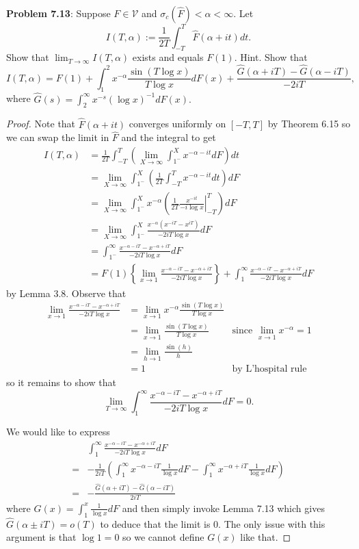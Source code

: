 \documentclass[12pt]{article}
\newcommand{\V}{\mathcal{V}}
\newcommand{\Fhat}{\widehat{F}}
\newcommand{\Ghat}{\widehat{G}}
\begin{document}
\fi

\textbf{Problem 7.13}: Suppose $F \in \V$ and $\sigma_c(\Fhat) < \alpha < \infty$. Let
$$I(T, \alpha) := \frac{1}{2T} \int_{-T}^T \Fhat(\alpha + it) dt.$$
Show that $\lim_{T \rightarrow \infty} I(T, \alpha)$ exists and equals $F(1)$. Hint. Show that
$$I(T, \alpha) = F(1) + \int_1^2 x^{-\alpha} \frac{\sin (T\log x)}{T \log x} dF(x) + \frac{\Ghat(\alpha + iT) - \Ghat(\alpha - iT)}{-2iT},$$
where $\Ghat(s) = \int_2^\infty x^{-s} (\log x)^{-1} dF(x).$

\begin{proof}
Note that $\Fhat(\alpha + it)$ converges uniformly on $[-T, T]$ by Theorem 6.15 so we can swap the limit in $\Fhat$ and the integral to get
\begin{align*}
I(T, \alpha) &= \frac{1}{2T} \int_{-T}^T \left( \lim_{X \rightarrow \infty} \int_{1^-}^X x^{-\alpha-it} dF \right) dt \\
&= \lim_{X \rightarrow \infty} \int_{1^-}^X \left( \frac{1}{2T} \int_{-T}^T x^{-\alpha-it}  dt \right) dF \\
&= \lim_{X \rightarrow \infty} \int_{1^-}^X x^{-\alpha} \left( \frac{1}{2T} \left. \frac{x^{-it}}{-i \log x} \right|_{-T}^T   \right) dF \\
&= \lim_{X \rightarrow \infty} \int_{1^-}^X \frac{x^{-\alpha}(x^{-iT} - x^{iT} )}{- 2 i T \log x} dF \\
&= \int_{1^-}^\infty \frac{x^{-\alpha-iT} - x^{-\alpha+iT}}{- 2 i T \log x} dF \\
&= F(1) \left\{ \lim_{x \rightarrow 1} \frac{x^{-\alpha-iT} - x^{-\alpha+iT}}{- 2 i T \log x} \right\} + \int_{1}^\infty \frac{x^{-\alpha-iT} - x^{-\alpha+iT}}{- 2 i T \log x} dF
\end{align*}
by Lemma 3.8. Observe that
\begin{align*}
\lim_{x \rightarrow 1} \frac{x^{-\alpha-iT} - x^{-\alpha+iT}}{- 2 i T \log x} &= \lim_{x \rightarrow 1} x^{-\alpha} \frac{\sin(T \log x)}{T \log x} \\
&= \lim_{x \rightarrow 1} \frac{\sin(T \log x)}{T \log x} &\text{since } \lim_{x \rightarrow 1} x^{-\alpha} = 1 \\
&= \lim_{h \rightarrow 1} \frac{\sin(h)}{h} \\
&= 1 &\text{by L'hospital rule}
\end{align*}
so it remains to show that
$$\lim_{T \rightarrow \infty} \int_{1}^\infty \frac{x^{-\alpha-iT} - x^{-\alpha+iT}}{- 2 i T \log x} dF = 0.$$

We would like to express
\begin{align*}
&\int_{1}^\infty \frac{x^{-\alpha-iT} - x^{-\alpha+iT}}{- 2 i T \log x} dF\\
=& - \frac{1}{2 i T} \left( \int_{1}^\infty x^{-\alpha-iT} \frac{1}{\log x} dF - \int_{1}^\infty x^{-\alpha+iT} \frac{1}{\log x} dF\right)\\
=& -\frac{\Ghat(\alpha + iT) - \Ghat(\alpha - iT)}{2iT}
\end{align*}
where $G(x) = \int_1^x \frac{1}{\log x} dF$ and then simply invoke Lemma 7.13 which gives $\Ghat(\alpha \pm iT) = o(T)$ to deduce that the limit is 0. The only issue with this argument is that $\log 1 = 0$ so we cannot define $G(x)$ like that.


\end{proof}
\end{document}
